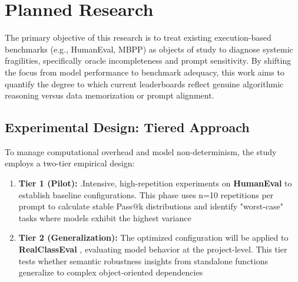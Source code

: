 \documentclass[11pt,a4paper]{article}
\begin{document}
\section{Planned Research}
The primary objective of this research is to treat existing execution-based benchmarks (e.g., HumanEval, MBPP) as objects of study to diagnose systemic fragilities, specifically oracle incompleteness and prompt sensitivity. By shifting the focus from model performance to benchmark adequacy, this work aims to quantify the degree to which current leaderboards reflect genuine algorithmic reasoning versus data memorization or prompt alignment.

\subsection{Experimental Design: Tiered Approach}
To manage computational overhead and model non-determinism, the study employs a two-tier empirical design:

\begin{enumerate}
    \item \textbf{Tier 1 (Pilot):} .Intensive, high-repetition experiments on \textbf{HumanEval} to establish baseline configurations. This phase uses n=10 repetitions per prompt to calculate stable Pass@k distributions and identify "worst-case" tasks where models exhibit the highest variance
    \item \textbf{Tier 2 (Generalization):} The optimized configuration will be applied to \textbf{RealClassEval} \cite{rahman2025syntheticbenchmarksevaluatingllm}, evaluating model behavior at the project-level. This tier tests whether semantic robustness insights from standalone functions generalize to complex object-oriented dependencies
\end{enumerate}
\end{document}
